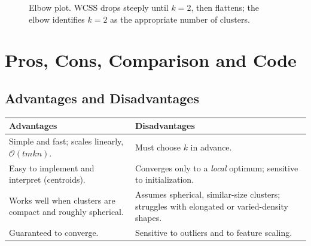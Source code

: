 \documentclass[11pt,a4paper]{report}
\theoremstyle{definition}
\theoremstyle{plain}
\theoremstyle{remark}
\begin{document}
	\begin{figure}[ht]
		\centering
		\caption{Elbow plot. WCSS drops steeply until $k=2$, then flattens; the elbow
			identifies $k=2$ as the appropriate number of clusters.}
		\label{fig:elbow}
	\end{figure}
	
	\chapter{Pros, Cons, Comparison and Code}
	
	\section{Advantages and Disadvantages}
	\begin{center}
		\begin{tabular}{@{}p{6.4cm}p{6.4cm}@{}}
			\toprule
			\textbf{Advantages} & \textbf{Disadvantages}\\
			\midrule
			Simple and fast; scales linearly, $\mathcal{O}(tmkn)$. & Must choose $k$ in
			advance.\\
			Easy to implement and interpret (centroids). & Converges only to a \emph{local}
			optimum; sensitive to initialization.\\
			Works well when clusters are compact and roughly spherical. & Assumes spherical,
			similar-size clusters; struggles with elongated or varied-density shapes.\\
			Guaranteed to converge. & Sensitive to outliers and to feature scaling.\\
			\bottomrule
		\end{tabular}
	\end{center}
	
\end{document}
